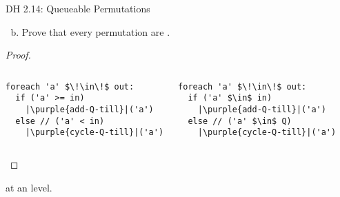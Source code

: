 \begin{frame}[fragile]{}
  \begin{exampleblock}{DH 2.14: Queueable Permutations}
    \begin{enumerate}[(a)]
      \setcounter{enumi}{1}
      \item Prove that every permutation are .
    \end{enumerate}
  \end{exampleblock}

  \begin{proof}
    \begin{columns}
	\begin{lstlisting}[style = Cstyle]
foreach 'a' $\!\in\!$ out:
  if ('a' >= in)
    |\purple{add-Q-till}|('a')
  else // ('a' < in)
    |\purple{cycle-Q-till}|('a')
        \end{lstlisting}
      \pause
	\begin{lstlisting}[style = Cstyle]
foreach 'a' $\!\in\!$ out:
  if ('a' $\in$ in)
    |\purple{add-Q-till}|('a')
  else // ('a' $\in$ Q)
    |\purple{cycle-Q-till}|('a')
      \end{lstlisting}
    \end{columns}
  \end{proof}
\end{frame}

\begin{frame}{}
  \centerline{\LARGE {}}

  \vspace{0.30cm}
  \pause


  \pause
  \vspace{1.00cm}
  \centerline{\Large {} at an  level.}
\end{frame}

